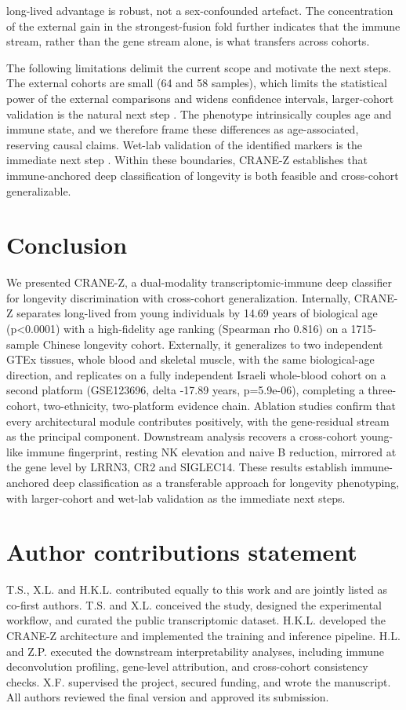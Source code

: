 \documentclass[11pt,a4paper]{article}
\begin{document}
long-lived advantage is robust, not a sex-confounded artefact. The concentration of the external gain in the strongest-fusion fold further indicates that the immune stream, rather than the gene stream alone, is what transfers across cohorts.

The following limitations delimit the current scope and motivate the next steps. The external cohorts are small (64 and 58 samples), which limits the statistical power of the external comparisons and widens confidence intervals, larger-cohort validation is the natural next step \cite{lin2024external}. The phenotype intrinsically couples age and immune state, and we therefore frame these differences as age-associated, reserving causal claims. Wet-lab validation of the identified markers is the immediate next step \cite{li2024longevity,zhang2025cross,yao2025aging,cheng2025markers,lu2025clock,li2025deep,romano2024centenarian}. Within these boundaries, CRANE-Z establishes that immune-anchored deep classification of longevity is both feasible and cross-cohort generalizable.

\section{Conclusion}\label{sec:concl}
We presented CRANE-Z, a dual-modality transcriptomic-immune deep classifier for longevity discrimination with cross-cohort generalization. Internally, CRANE-Z separates long-lived from young individuals by 14.69 years of biological age (p<0.0001) with a high-fidelity age ranking (Spearman rho 0.816) on a 1715-sample Chinese longevity cohort. Externally, it generalizes to two independent GTEx tissues, whole blood and skeletal muscle, with the same biological-age direction, and replicates on a fully independent Israeli whole-blood cohort on a second platform (GSE123696, delta -17.89 years, p=5.9e-06), completing a three-cohort, two-ethnicity, two-platform evidence chain. Ablation studies confirm that every architectural module contributes positively, with the gene-residual stream as the principal component. Downstream analysis recovers a cross-cohort young-like immune fingerprint, resting NK elevation and naive B reduction, mirrored at the gene level by LRRN3, CR2 and SIGLEC14. These results establish immune-anchored deep classification as a transferable approach for longevity phenotyping, with larger-cohort and wet-lab validation as the immediate next steps.

\section{Author contributions statement}\label{sec:contrib}
T.S., X.L. and H.K.L. contributed equally to this work and are jointly listed as co-first authors. T.S. and X.L. conceived the study, designed the experimental workflow, and curated the public transcriptomic dataset. H.K.L. developed the CRANE-Z architecture and implemented the training and inference pipeline. H.L. and Z.P. executed the downstream interpretability analyses, including immune deconvolution profiling, gene-level attribution, and cross-cohort consistency checks. X.F. supervised the project, secured funding, and wrote the manuscript. All authors reviewed the final version and approved its submission.
\end{document}
